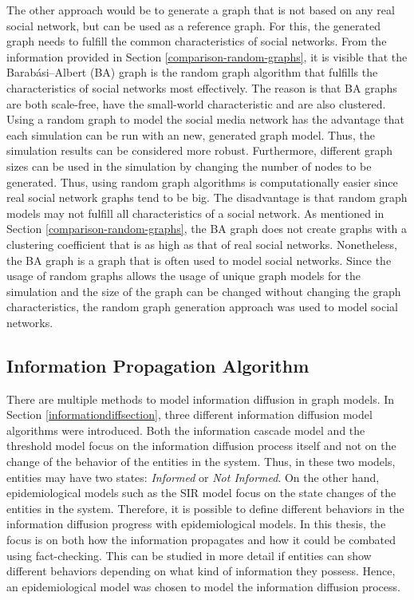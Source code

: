 The other approach would be to generate a graph that is not based
on any real social network, but can be used as a reference graph.
For this, the generated graph needs to fulfill the common
characteristics of social networks.
From the information provided in Section \ref{comparison-random-graphs}, 
it is visible that the Barabási–Albert (BA) graph is the random graph 
algorithm that fulfills the characteristics of social networks most effectively.
The reason is that BA graphs are both scale-free, have the small-world
characteristic and are also clustered.
Using a random graph to model the social media network has the advantage
that each simulation can be run with an new, generated graph model. 
Thus, the simulation results can be considered more robust. 
Furthermore, different graph sizes can be 
used in the simulation by changing the number of nodes to be generated.
Thus, using random graph algorithms is computationally easier since 
real social network graphs tend to be big.
The disadvantage is that random graph models may not fulfill
all characteristics of a social network. As mentioned in 
Section \ref{comparison-random-graphs}, the BA graph
does not create graphs with a clustering coefficient that is as 
high as that of real social networks. Nonetheless, the BA graph is
a graph that is often used to model social networks.
Since the usage of random graphs allows the usage
of unique graph models for the simulation and the size of the 
graph can be changed without changing the graph characteristics, 
the random graph generation approach was used to model social networks.

\subsection{Information Propagation Algorithm}
\label{modelinformationdiffusion}

There are multiple methods to model information diffusion in graph models.
In Section \ref{informationdiffsection}, three different information diffusion
model algorithms were introduced.
Both the information cascade model and the threshold model focus on the 
information diffusion process itself and not on the change of the behavior
of the entities in the system. Thus, in these two models,
entities may have two states: 
\textit{Informed} or \textit{Not Informed}.
On the other hand, epidemiological models such as the SIR model
focus on the state changes of the entities in the system.
Therefore, it is possible to define different behaviors in the
information diffusion progress with epidemiological models. 
In this thesis, the focus is on both how the information
propagates and how it could be combated using fact-checking.
This can be studied in more detail if entities can 
show different behaviors depending on what kind of information
they possess. Hence, an epidemiological model was chosen 
to model the information diffusion process.

